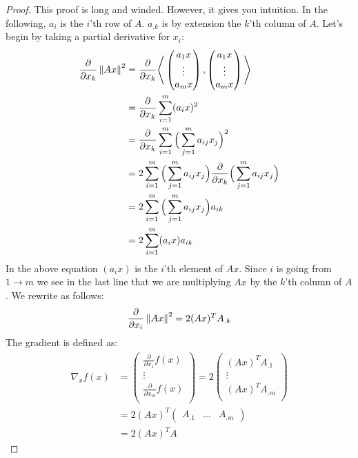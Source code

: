 \begin{proof}
\label{sec:gradient_squared_norm}
This proof is long and winded. However, it gives you intuition.
In the following, $a_i$ is the $i$'th row of $A$. $a_{.k}$
is by extension the $k$'th column of $A$.
Let's begin by taking a partial derivative for $x_i$:
\begin{equation}
\begin{split}
\frac{\partial}{\partial x_k} \left\lVert Ax\right\rVert^2 
&= \frac{\partial}{\partial x_k} \Bigg\langle 
\begin{pmatrix}
a_1x \\
\vdots \\
a_mx
\end{pmatrix},
\begin{pmatrix}
a_1x \\
\vdots \\
a_mx \\
\end{pmatrix} \Bigg\rangle \\
&= \frac{\partial}{\partial x_k}\sum_{i=1}^{m} (a_ix)^2 \\
&= \frac{\partial}{\partial x_k}\sum_{i=1}^{m} \Big(\sum_{j=1}^{m} a_{ij}x_j\Big)^2 \\
&= 2\sum_{i=1}^{m}\Big(\sum_{j=1}^{m} a_{ij}x_j \Big) \frac{\partial}{\partial x_k} 
		\Big(\sum_{j=1}^{m} a_{ij}x_j \Big)\\
&= 2\sum_{i=1}^{m}\Big(\sum_{j=1}^{m} a_{ij}x_j \Big) a_{ik} \\
&= 2\sum_{i=1}^{m}(a_ix)a_{ik}
\end{split}
\end{equation}
In the above equation $(a_ix)$ is the $i$'th element of $Ax$.
Since $i$ is going from $1 \rightarrow m$ we see in the last line
that we are multiplying $Ax$ by the $k$'th column of $A$.
We rewrite as follows:
\begin{equation}
\frac{\partial}{\partial x_i} \left\lVert Ax\right\rVert^2 = 2(Ax)^TA_{.k}
\end{equation}
The gradient is defined as:
\begin{equation}
\begin{split}
\nabla_x f(x)&= 
\begin{pmatrix}
\frac{\partial}{\partial x_1} f(x)\\
\vdots \\
\frac{\partial}{\partial x_m} f(x)\\
\end{pmatrix}
=2
\begin{pmatrix}
(Ax)^TA_{.1}\\
\vdots \\
(Ax)^TA_{.m} \\
\end{pmatrix} \\
&= 2(Ax)^T\begin{pmatrix}
A_{.1} &
\hdots &
A_{.m}
\end{pmatrix} \\
&= 2 (Ax)^T A
\end{split}
\end{equation}
\end{proof}